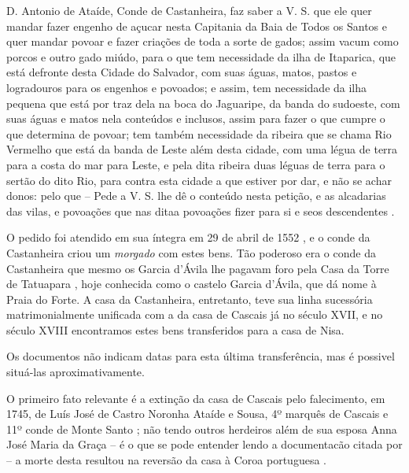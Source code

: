 \begin{citacao}
D. Antonio de Ataíde, Conde de Castanheira, faz saber a V. S. que ele quer mandar fazer engenho de açucar nesta Capitania da Baia de Todos os Santos e quer mandar povoar e fazer criações de toda a sorte de gados; assim vacum como porcos e outro gado miúdo, para o que tem necessidade da ilha de Itaparica, que está defronte desta Cidade do Salvador, com suas águas, matos, pastos e logradouros para os engenhos e povoados; e assim, tem necessidade da ilha pequena que está por traz dela na boca do Jaguaripe, da banda do sudoeste, com suas águas e matos nela conteúdos e inclusos, assim para fazer o que cumpre o que determina de povoar; tem também necessidade da ribeira que se chama Rio Vermelho que está da banda de Leste além desta cidade, com uma légua de terra para a costa do mar para Leste, e pela dita ribeira duas léguas de terra para o sertão do dito Rio, para contra esta cidade a que estiver por dar, e não se achar donos: pelo que -- Pede a V. S. lhe dê o conteúdo nesta petição, e as alcadarias das vilas, e povoações que nas ditaa povoações fizer para si e seos descendentes \cite[p.~III-3]{teixeira_doacoes_1978}.
\end{citacao}

O pedido foi atendido em sua íntegra em 29 de abril de 1552 \cite[p.~III-3 - III-4]{teixeira_doacoes_1978}, e o conde da Castanheira criou um \textit{morgado} com estes bens. Tão poderoso era o conde da Castanheira que mesmo os Garcia d'Ávila lhe pagavam foro pela Casa da Torre de Tatuapara \cite[p.~III-5]{teixeira_doacoes_1978}, hoje conhecida como o castelo Garcia d'Ávila, que dá nome à Praia do Forte. A casa da Castanheira, entretanto, teve sua linha sucessória matrimonialmente unificada com a da casa de Cascais já no século XVII, e no século XVIII encontramos estes bens transferidos para a casa de Nisa.

Os documentos não indicam datas para esta última transferência, mas é possivel situá-las aproximativamente. 

O primeiro fato relevante é a extinção da casa de Cascais pelo falecimento, em 1745, de Luís José de Castro Noronha Ataíde e Sousa, 4º marquês de Cascais e 11º conde de Monte Santo \cite{wiki_cascais_2015}; não tendo outros herdeiros além de sua esposa Anna José Maria da Graça -- é o que se pode entender lendo a documentacão citada por  -- a morte desta resultou na reversão da casa à Coroa portuguesa \cite{wiki_cascais_2015}. 


